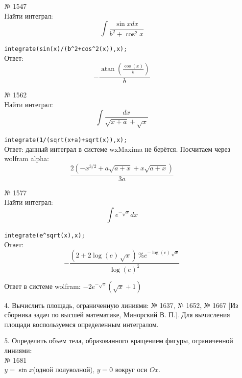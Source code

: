 \documentclass[article, bachelor, och, pract]{SCWorks}
\begin{document}
\begin{itemize}
№ 1547\\
Найти интеграл:
$$\int\frac{\sin{x}dx}{b^2+\cos^2{x}}$$

\texttt{integrate(sin(x)/(b\^{}2+cos\^{}2(x)),x);}\\

Ответ: \[-\frac{\operatorname{atan}\left( \frac{\cos{(x)}}{b}\right) }{b}\]


№ 1562\\
Найти интеграл:
$$\int\frac{dx}{\sqrt{x+a}+\sqrt{x}}$$

\texttt{integrate(1/(sqrt(x+a)+sqrt(x)),x);}\\

Ответ: данный интеграл в системе wxMaxima не берётся.
Посчитаем через wolfram alpha: $$\frac{2(-x^{3/2}+a\sqrt{a+x}+x\sqrt{a+x})}{3a}$$


№ 1577\\
Найти интеграл:
$$\int e^{-\sqrt{x}}dx$$

\texttt{integrate(e\^{}sqrt(x),x);}\\

Ответ: \[-\frac{\left( 2+2\log{(e)}\,\sqrt{x}\right) \,{{\%{}e}^{-\log{(e)}\,\sqrt{x}}}}{{{\log{(e)}}^{2}}}\]

Ответ в системе wolfram: $-2e^{-\sqrt{x}}(\sqrt{x}+1)$

\item[4.] Вычислить площадь, ограниченную линиями: № 1637, № 1652, № 1667 [Из сборника задач по высшей математике, Минорский В. П.]. Для вычисления площади воспользуемся определенным интегралом.


\item[5.] Определить объем тела, образованного вращением фигуры, ограниченной линиями:\\

№ 1681 \\
$y = \sin{x}$(одной полуволной), $y=0$ вокруг оси $Ox$.

\end{itemize}


\newpage
\end{document}
